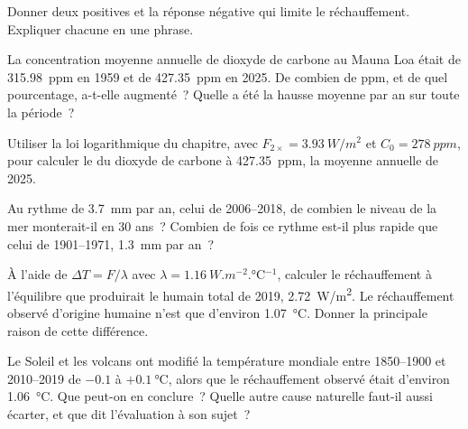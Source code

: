 \begin{exercise}[$\star$]\label{exo:g12:climate-change:5}
Donner deux  positives et la réponse négative qui
limite le réchauffement. Expliquer chacune en une phrase.
\end{exercise}

\begin{exercise}[$\star\star$]\label{exo:g12:climate-change:6}
La concentration moyenne annuelle de dioxyde de carbone au Mauna Loa était
de \qty{315.98}{ppm} en 1959 et de \qty{427.35}{ppm} en 2025. De combien de
ppm, et de quel pourcentage, a-t-elle augmenté~? Quelle a été la hausse
moyenne par an sur toute la période~?
\end{exercise}

\begin{exercise}[$\star\star$]\label{exo:g12:climate-change:7}
Utiliser la loi logarithmique du chapitre, avec $F_{2\times} =
\qty{3.93}{W/m^2}$ et $C_0 = \qty{278}{ppm}$, pour calculer le  du
dioxyde de carbone à \qty{427.35}{ppm}, la moyenne annuelle de 2025.
\end{exercise}

\begin{exercise}[$\star\star$]\label{exo:g12:climate-change:8}
Au rythme de \qty{3.7}{mm} par an, celui de 2006--2018, de combien le
niveau de la mer monterait-il en 30 ans~? Combien de fois ce rythme est-il
plus rapide que celui de 1901--1971, \qty{1.3}{mm} par an~?
\end{exercise}

\begin{exercise}[$\star\star$]\label{exo:g12:climate-change:9}
À l'aide de $\Delta T = F/\lambda$ avec $\lambda = \qty{1.16}{W.m^{-2}.\degreeCelsius^{-1}}$,
calculer le réchauffement à l'équilibre que produirait le  humain
total de 2019, \qty{2.72}{W/m^2}. Le réchauffement observé d'origine
humaine n'est que d'environ \qty{1.07}{\degreeCelsius}. Donner la
principale raison de cette différence.
\end{exercise}

\begin{exercise}[$\star\star$]\label{exo:g12:climate-change:10}
Le Soleil et les volcans ont modifié la température mondiale entre
1850--1900 et 2010--2019 de $-0.1$ à $+\qty{0.1}{\degreeCelsius}$, alors
que le réchauffement observé était d'environ \qty{1.06}{\degreeCelsius}.
Que peut-on en conclure~? Quelle autre cause naturelle faut-il aussi
écarter, et que dit l'évaluation à son sujet~?
\end{exercise}

